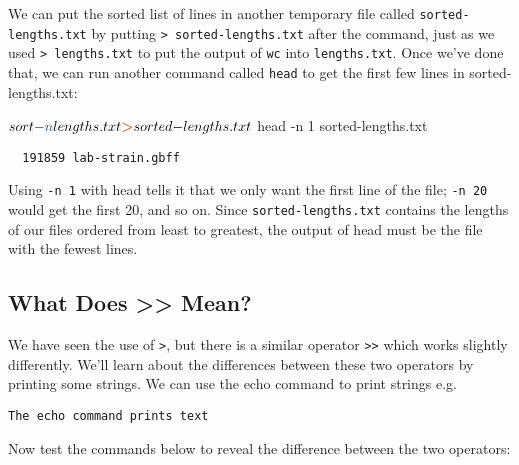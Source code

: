 \documentclass[
]{book}
\newenvironment{Shaded}{\begin{snugshade}}{\end{snugshade}}
\newcommand{\AttributeTok}[1]{\textcolor[rgb]{0.13,0.29,0.53}{#1}}
\newcommand{\ExtensionTok}[1]{#1}
\newcommand{\NormalTok}[1]{#1}
\newcommand{\OperatorTok}[1]{\textcolor[rgb]{0.81,0.36,0.00}{\textbf{#1}}}
\begin{document}
We can put the sorted list of lines in another temporary file called \texttt{sorted-lengths.txt} by putting \texttt{\textgreater{}\ sorted-lengths.txt} after the command, just as we used \texttt{\textgreater{}\ lengths.txt} to put the output of \texttt{wc} into \texttt{lengths.txt}. Once we've done that, we can run another command called \texttt{head} to get the first few lines in sorted-lengths.txt:

\begin{Shaded}
\begin{Highlighting}[]
\ExtensionTok{$}\NormalTok{ sort }\AttributeTok{{-}n}\NormalTok{ lengths.txt }\OperatorTok{\textgreater{}}\NormalTok{ sorted{-}lengths.txt}
\ExtensionTok{$}\NormalTok{ head }\AttributeTok{{-}n}\NormalTok{ 1 sorted{-}lengths.txt}
\end{Highlighting}
\end{Shaded}

\begin{verbatim}
  191859 lab-strain.gbff
\end{verbatim}

Using \texttt{-n\ 1} with head tells it that we only want the first line of the file; \texttt{-n\ 20} would get the first 20, and so on. Since \texttt{sorted-lengths.txt} contains the lengths of our files ordered from least to greatest, the output of head must be the file with the fewest lines.

\subsection{What Does \textgreater\textgreater{} Mean?}\label{what-does-mean}

We have seen the use of \texttt{\textgreater{}}, but there is a similar operator \texttt{\textgreater{}\textgreater{}} which works slightly differently. We'll learn about the differences between these two operators by printing some strings. We can use the echo command to print strings e.g.

\begin{Shaded}
\end{Shaded}

\begin{verbatim}
The echo command prints text
\end{verbatim}

Now test the commands below to reveal the difference between the two operators:
\end{document}
